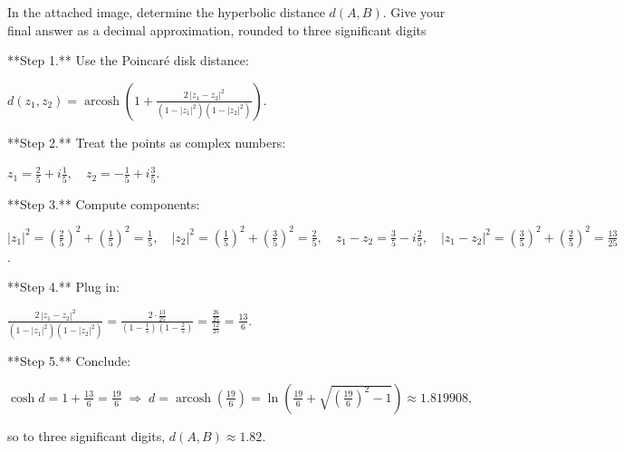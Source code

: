 In the attached image, determine the hyperbolic distance $d(A,B)$. Give your final answer as a decimal approximation, rounded to three significant digits

**Step 1.** Use the Poincaré disk distance:

$d(z_1,z_2)=\operatorname{arcosh}\!\left(1+\frac{2\,|z_1-z_2|^2}{(1-|z_1|^2)(1-|z_2|^2)}\right)$.

  

**Step 2.** Treat the points as complex numbers:

$z_1=\tfrac{2}{5}+i\tfrac{1}{5},\quad z_2=-\tfrac{1}{5}+i\tfrac{3}{5}$.

  

**Step 3.** Compute components:

$|z_1|^2=(\tfrac{2}{5})^2+(\tfrac{1}{5})^2=\tfrac{1}{5},\quad |z_2|^2=(\tfrac{1}{5})^2+(\tfrac{3}{5})^2=\tfrac{2}{5},\quad z_1-z_2=\tfrac{3}{5}-i\tfrac{2}{5},\quad |z_1-z_2|^2=(\tfrac{3}{5})^2+(\tfrac{2}{5})^2=\tfrac{13}{25}$.

  

**Step 4.** Plug in:

$\displaystyle \frac{2\,|z_1-z_2|^2}{(1-|z_1|^2)(1-|z_2|^2)}=\frac{2\cdot\tfrac{13}{25}}{(1-\tfrac{1}{5})(1-\tfrac{2}{5})}=\frac{\tfrac{26}{25}}{\tfrac{12}{25}}=\tfrac{13}{6}$.

  

**Step 5.** Conclude:

$\cosh d=1+\tfrac{13}{6}=\tfrac{19}{6}\;\Rightarrow\; d=\operatorname{arcosh}\!\left(\tfrac{19}{6}\right)=\ln\!\left(\tfrac{19}{6}+\sqrt{\left(\tfrac{19}{6}\right)^2-1}\right)\approx 1.819908,$

so to three significant digits, $\boxed{d(A,B)\approx 1.82}$.